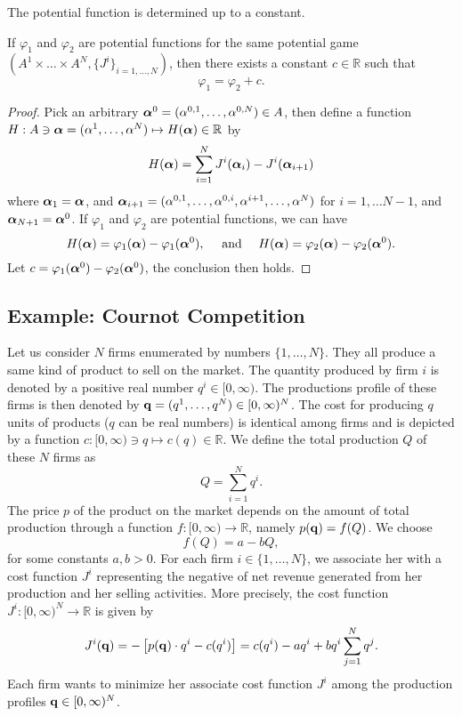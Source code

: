 \begin{proposition}
	The potential function is determined up to a constant.
	
	If $\varphi_1$ and $\varphi_2$ are potential functions for the same potential game $(A^1 \times\ldots \times A^N, \{J^i\}_{i=1,\ldots,N})$, then there exists a constant $c \in \mathbb{R}$ such that
	$$
		\varphi_1 = \varphi_2 + c.
	$$
\end{proposition}
\begin{proof}
	Pick an arbitrary $\boldsymbol{\alpha}^0 = (\alpha^{0,1}, \ldots, \alpha^{0,N}) \in A$, then define a function $H: A \ni \boldsymbol{\alpha}= (\alpha^1, \ldots, \alpha^N) \mapsto H(\boldsymbol{\alpha}) \in \mathbb{R}$ 
	by
	\begin{equation}
		H(\boldsymbol{\alpha}) = \sum_{i=1}^N J^{i}(\boldsymbol{\alpha}_{i}) - J^{i}(\boldsymbol{\alpha}_{i+1})
	\end{equation}
	where
	$\boldsymbol{\alpha}_{1} = \boldsymbol{\alpha}$, and $\boldsymbol{\alpha}_{i+1} = (\alpha^{0,1}, \ldots, \alpha^{0,i}, \alpha^{i+1}, \ldots, \alpha^N)$ for $i=1,\ldots N-1$, and $\boldsymbol{\alpha}_{N+1} = \boldsymbol{\alpha}^0$.
	If $\varphi_1$ and $\varphi_2$ are potential functions, we can have
	$$
		H(\boldsymbol{\alpha}) = \varphi_1(\boldsymbol{\alpha}) - \varphi_1(\boldsymbol{\alpha}^0), \quad \text{ and } \quad  H(\boldsymbol{\alpha})= \varphi_2(\boldsymbol{\alpha}) - \varphi_2(\boldsymbol{\alpha}^0).
	$$
	Let $c = \varphi_1(\boldsymbol{\alpha}^0) - \varphi_2(\boldsymbol{\alpha}^0)$, the conclusion then holds.
\end{proof}



\subsection{Example: Cournot Competition}

Let us consider $N$ firms enumerated by numbers $\{1,\ldots,N\}$. They all produce a same kind of product to sell on the market. The quantity produced by firm $i$ is denoted by a positive real number $q^i \in [0,\infty)$. The productions profile of these firms is then denoted by $\mathbf{q} = (q^1, \ldots,q^N) \in [0,\infty)^{N}$.  The cost for producing $q$ units of products ($q$ can be real numbers) is identical among firms and is depicted by a function $c: [0,\infty) \ni q \mapsto c(q) \in \mathbb{R}$. We define the total production $Q$ of these $N$ firms as
$$
	Q = \sum_{i=1}^N q^i.
$$
The price $p$ of the product on the market depends on the amount of total production through a function $f: [0,\infty) \to \mathbb{R}$, namely $p(\mathbf{q})=f(Q)$. We choose 
$$
	f(Q) = a - bQ,
$$
for some constants $a,b > 0$.
For each firm $i \in \{1,\ldots,N\}$, we associate her with a cost function $J^i$ representing the negative of net revenue generated from her production and her selling activities. More precisely, the cost function $J^i: [0, \infty)^N \to \mathbb{R}$ is given by
$$
	J^i(\mathbf{q}) = - \left[ p(\mathbf{q}) \cdot q^i - c(q^i) \right] = c(q^i) - a q^i + b q^i \sum_{j=1}^N q^j.
$$
Each firm wants to minimize her associate cost function $J^i$ among the production profiles $\mathbf{q} \in [0,\infty)^N$.


